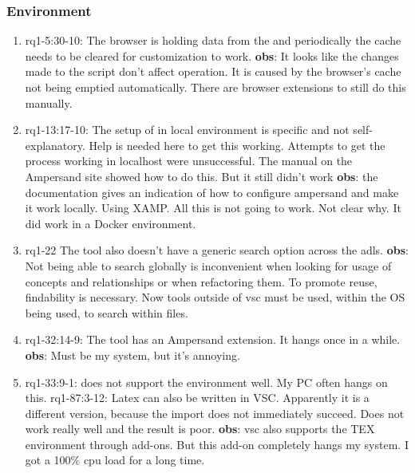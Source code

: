 \subsubsection{Environment}
\begin{comment}
plaats hier de afgehandelde items.
\end{comment}
\begin{enumerate}
    \item rq1-5:30-10: The browser is holding data from the  and periodically the cache needs to be cleared for customization to work.
    \newline\textbf{obs}: It looks like the changes made to the script don't affect operation.
    It is caused by the browser's cache not being emptied automatically.
    There are browser extensions to still do this manually.
    
    \item rq1-13:17-10: The setup of  in local environment is specific and not self-explanatory.
    Help is needed here to get this working.
    Attempts to get the process working in localhost were unsuccessful.
    The manual on the Ampersand site showed how to do this.
    But it still didn't work
    \newline\textbf{obs}: the documentation gives an indication of how to configure ampersand and make it work locally.
    Using XAMP.
    All this is not going to work.
    Not clear why.
    It did work in a Docker environment.
     
    \item rq1-22 The tool  also doesn't have a generic search option across the adls.
    \newline\textbf{obs}: Not being able to search globally is inconvenient when looking for usage of concepts and relationships or when refactoring them.
    To promote reuse, findability is necessary.
    Now tools outside of \acrshort{vsc} must be used, within the OS being used, to search within files.
    
    \item rq1-32:14-9: The tool  has an Ampersand extension.
    It hangs once in a while.
    \newline\textbf{obs}: Must be my system, but it's annoying.
     
    \item rq1-33:9-1:  does not support the  environment well.
    My PC often hangs on this.
    \newline rq1-87:3-12: Latex can also be written in VSC.
    Apparently it is a different version, because the import does not immediately succeed.
    Does not work really well and the result is poor.
    \newline\textbf{obs}: \acrlong{vsc} also supports the TEX environment through add-ons.
    But this add-on completely hangs my system.
    I got a 100\% cpu load for a long time. 
    

\end{enumerate}
